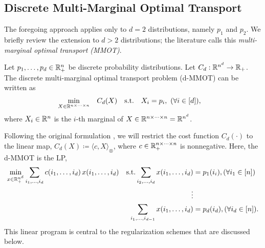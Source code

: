 \subsection{Discrete Multi-Marginal Optimal Transport}

The foregoing approach 
applies only to $d=2$ distributions, namely $p_1$ and $p_2$. We briefly review the extension 
to $d>2$ distributions; 
the literature calls this \textit{multi-marginal optimal transport (MMOT)}.%

\begin{definition}\label{def:dmmot}
Let $p_1, \ldots, p_d\in\mathbb{R}^n_{+}$ be discrete probability distributions. %
Let $C_d : \mathbb{R}^{n^{d}}\rightarrow \mathbb{R}_{+}$. 
The discrete multi-marginal optimal transport problem (d-MMOT) can be written as
\begin{align*}%
    &\underset{{X \in \RR^{n\times \cdots \times n}}}{\textrm{min}}\quad C_d(X) \quad \textrm{s.t.}\quad X_i = p_i,\ (\forall i\in [d]),
\end{align*}
where $X_i \in \mathbb{R}^n$ is the $i$-th marginal of  $X \in \mathbb{R}^{n\times \cdots \times n}=\mathbb{R}^{n^{d}}$.
\end{definition}
Following the original formulation \citep{kantorovich1942}, we will restrict the cost function $C_d(\cdot)$ to the linear map, $C_d(X) \coloneqq \langle c, X \rangle_{\otimes}$, where $c \in \mathbb{R}_{+}^{n\times \cdots \times n}$ is nonnegative.
Here, the d-MMOT is the LP,
\begin{align}\label{eq:gemd}\begin{aligned}
    \underset{x\in\mathbb{R}^{n^{d}}_{+}} {\textrm{min}}
    \sum_{i_1,\ldots,i_d} c(i_1,\ldots, i_d)\, x(i_1,\ldots,i_d) \quad \textrm{s.t.}
    \sum_{i_2,\ldots,i_d} x(i_1,\ldots,i_d) &= p_1(i_i), (\forall i_1\in[n])\\
    \qquad\vdots\\
    \sum_{i_1,\ldots,i_{d-1}} x(i_1,\ldots,i_d) &= p_{d}(i_{d}), (\forall i_d\in[n]).
    \end{aligned}
\end{align}
This linear program is central to the regularization schemes that are discussed below.
